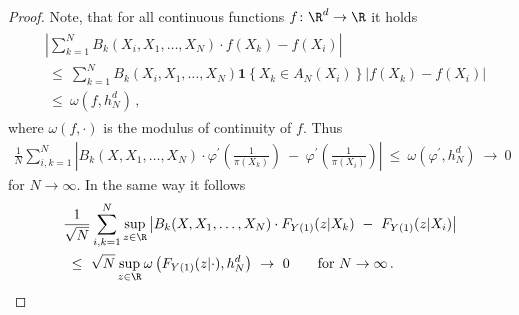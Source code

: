 \begin{proof}
 Note, that for all continuous functions $f\colon \R^d\to \R$ it holds
 \begin{align}
   \begin{split}
   &
   \left|
  \sum_{k=1}^{N}
    B_k(X_i,X_1,\ldots,X_N)\cdot 
    f(X_k)
    -
    f(X_i)
   \right|
   \\
   &
   \ 
   \le
   \ 
  \sum_{k=1}^{N}
    B_k(X_i,X_1,\ldots,X_N)
    \mathbf{1}\left\{
      X_k\in A_N(X_i)
    \right\}
    \left|
    f(X_k)
    -
    f(X_i)
    \right|
   \\
   &
   \ 
   \le
   \ 
   \omega
   \left(
    f,h_N^d
   \right)
   \,,
   \end{split}
 \end{align}
 where $\omega(f,\cdot)$ is the modulus of continuity of $f$. 
 Thus
      \begin{align*}
        \frac
        {1}
        {N}
        \sum_{i,k=1}^{N}
            \left|
        B_k(X,X_1,\ldots,X_N)
        \cdot
            \varphi^{'}
            \left(
              \frac
              {1}
              {\pi(X_k)}
            \right)
            \ 
            -
            \ 
            \varphi^{'}
            \left(
              \frac
              {1}
              {\pi(X_i)}
            \right)
            \right|
            \ 
            \le
            \ 
   \omega
   \left(
     \varphi^{'},h_N^d
   \right)
            \ 
            \to
            \ 
            0
          \end{align*}
          for $N\to\infty$.
          In the same way it follows
      \begin{align*}
            &
        \frac
        {1}
        {\sqrt{N}}
        \sum_{i,k=1}^{N}
        \sup_{z\in\R}
            \left|
        B_k(X,X_1,\ldots,X_N)
        \cdot
        F_{Y(1)}(z|X_k)
            \ 
            -
            \ 
        F_{Y(1)}(z|X_i)
            \right|
            \\
            &
            \ 
            \le
            \ 
            \sqrt{N}
            \sup_{z\in\R}
            \omega
            \left(
        F_{Y(1)}(z|\cdot)
        ,
        h_N^d
            \right)
            \ 
            \to
            \ 
            0
            \qquad
            \text{for}
            \ 
            N\to\infty
            \,.
      \end{align*}
\end{proof}
